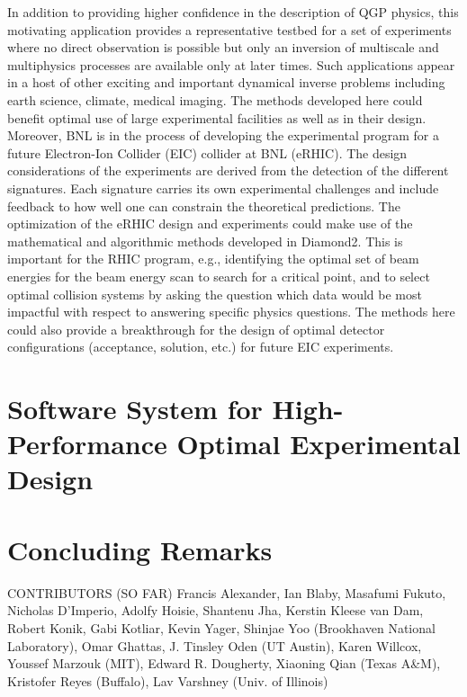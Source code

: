 \documentclass[11pt]{article}
\begin{document}
 In addition to providing higher confidence in the
description of QGP physics, this motivating application provides a
representative testbed for a set of experiments where no direct
observation is possible but only an inversion of multiscale and
multiphysics processes are available only at later times.  Such
applications appear in a host of other exciting and important
dynamical inverse problems including earth science, climate, medical
imaging. The methods developed here could benefit optimal use of large
experimental facilities as well as in their design.  Moreover, BNL is
in the process of developing the experimental program for a future
Electron-Ion Collider (EIC) collider at BNL (eRHIC). The design
considerations of the experiments are derived from the detection of
the different signatures. Each signature carries its own experimental
challenges and include feedback to how well one can constrain the
theoretical predictions.  The optimization of the eRHIC design and
experiments could make use of the mathematical and algorithmic methods
developed in Diamond2.  This is important for the RHIC program, e.g.,
identifying the optimal set of beam energies for the beam energy scan
to search for a critical point, and to select optimal collision
systems by asking the question which data would be most impactful with
respect to answering specific physics questions.  The methods here
could also provide a breakthrough for the design of optimal detector
configurations (acceptance, solution, etc.) for future EIC
experiments.




\section{Software System for High-Performance Optimal Experimental Design}

\section{Concluding Remarks}

\newpage



\begin{center}
CONTRIBUTORS (SO FAR)
\normalsize Francis Alexander, Ian Blaby, Masafumi Fukuto, Nicholas D'Imperio, Adolfy Hoisie,
Shantenu Jha, Kerstin Kleese van Dam, Robert Konik, Gabi Kotliar,
Kevin Yager, Shinjae Yoo (Brookhaven National Laboratory), Omar
Ghattas, J. Tinsley Oden (UT Austin), Karen Willcox, Youssef Marzouk
(MIT), Edward R. Dougherty, Xiaoning Qian (Texas A\&M), Kristofer
Reyes (Buffalo), Lav Varshney (Univ. of Illinois)

\end{center}
\end{document}
